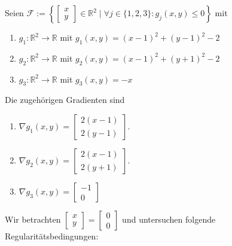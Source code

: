 
Seien $\mathcal F:=\left\{\begin{bmatrix}x\\y\end{bmatrix}\in\mathbb R^2\mid \forall j\in\{1,2,3\}:g_j(x,y)\leq 0\right\}$ mit 
\begin{enumerate}
\item $g_1: \mathbb R^2\to\mathbb R$ mit $g_1(x,y)=(x-1)^2+(y-1)^2-2$
\item $g_2: \mathbb R^2\to\mathbb R$ mit $g_2(x,y)=(x-1)^2+(y+1)^2-2$
\item $g_3: \mathbb R^2\to\mathbb R$ mit $g_3(x,y)=-x$
\end{enumerate}
Die zugehörigen Gradienten sind
\begin{enumerate}
\item $\nabla g_1(x,y)=\begin{bmatrix}2(x-1)\\2(y-1)\end{bmatrix}$.
\item $\nabla g_2(x,y)=\begin{bmatrix}2(x-1)\\2(y+1)\end{bmatrix}$.
\item $\nabla g_3(x,y)=\begin{bmatrix}-1\\0\end{bmatrix}$
\end{enumerate}
Wir betrachten $\begin{bmatrix}x\\y\end{bmatrix}=\begin{bmatrix}0\\0\end{bmatrix}$ und untersuchen folgende Regularitätsbedingungen:
